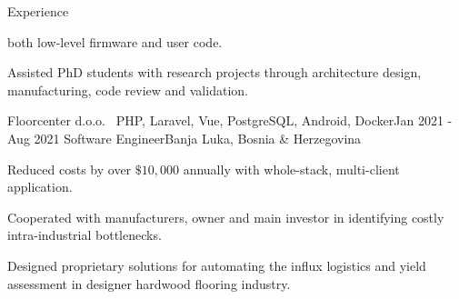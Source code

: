 \documentclass{resume}
\begin{document}
\begin{rSection}{Experience}
\begin{rSubsection}
            both low-level firmware and user code.
        \item Assisted PhD students with research projects through
            architecture design, manufacturing, code review and validation.
    \end{rSubsection}
    \begin{rSubsection}
        {Floorcenter d.o.o. \mid\ \textnormal{PHP, Laravel, Vue, PostgreSQL,
        Android, Docker}}{Jan 2021 - Aug 2021}
        {Software Engineer}{Banja Luka, Bosnia \& Herzegovina}
        \item Reduced costs by over $\$10,000$ annually with whole-stack,
            multi-client application.
        \item Cooperated with manufacturers, owner and main investor in
            identifying costly intra-industrial bottlenecks.
        \item Designed proprietary solutions for automating the influx logistics
            and yield assessment in designer hardwood flooring industry.
    \end{rSubsection}
\end{rSection}
\end{document}
